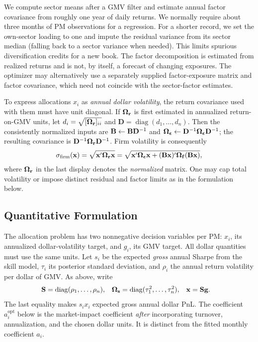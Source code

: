 \documentclass[11pt]{gappyarticle}
\begin{document}
We compute sector means after a GMV filter and estimate annual factor
covariance from roughly one year of daily returns. We normally require
about three months of PM observations for a regression. For a shorter
record, we set the own-sector loading to one and impute the residual
variance from its sector median (falling back to a sector variance when
needed). This limits spurious diversification credits for a new book. The
factor decomposition is estimated from realized returns and is not, by
itself, a forecast of changing exposures. The optimizer may alternatively
use a separately supplied factor-exposure matrix and factor covariance,
which need not coincide with the sector-factor estimates.

To express allocations $x_i$ as \emph{annual dollar volatility}, the return
covariance used with them must have unit diagonal. If ${\boldsymbol{\Omega}}_{\mathbf{r}}$ is first
estimated in annualized return-on-GMV units, let
$d_i=\sqrt{[{\boldsymbol{\Omega}}_{\mathbf{r}}]_{ii}}$ and
$\mathbf D=\operatorname{diag}(d_1,\ldots,d_n)$. Then the consistently normalized
inputs are ${\mathbf{B}}\leftarrow{\mathbf{B}}\mathbf D^{-1}$ and
${\boldsymbol{\Omega}}_{\boldsymbol{\epsilon}}\leftarrow\mathbf D^{-1}{\boldsymbol{\Omega}}_{\boldsymbol{\epsilon}}\mathbf D^{-1}$;
the resulting covariance is
$\mathbf D^{-1}{\boldsymbol{\Omega}}_{\mathbf{r}}\mathbf D^{-1}$. Firm volatility is consequently
\begin{align}
    \sigma_{\mathrm{firm}}({\mathbf{x}})
       =\sqrt{{\mathbf{x}}'{\boldsymbol{\Omega}}_{\mathbf{r}}{\mathbf{x}}}
       =\sqrt{{\mathbf{x}}'{\boldsymbol{\Omega}}_{\boldsymbol{\epsilon}}{\mathbf{x}}
             +({\mathbf{B}}{\mathbf{x}})'{\boldsymbol{\Omega}}_{\mathbf{f}}({\mathbf{B}}{\mathbf{x}})},
\end{align}
where ${\boldsymbol{\Omega}}_{\mathbf{r}}$ in the last display denotes the \emph{normalized}
matrix. One may cap total volatility or impose distinct residual and factor
limits as in the formulation below.

\subsection{Quantitative Formulation}
The allocation problem has two nonnegative decision variables per PM:
$x_i$, its annualized dollar-volatility target, and $g_i$, its GMV target.
All dollar quantities must use the same units. Let $s_i$ be the expected
\emph{gross} annual Sharpe from the skill
model, $\tau_i$ its posterior standard deviation, and $\rho_i$ the annual
return volatility per dollar of GMV. As above, write
\begin{align}
    {\mathbf{S}}&=\operatorname{diag}(\rho_1,\ldots,\rho_n),&
    {\boldsymbol{\Omega}}_{\mathbf{s}}&=\operatorname{diag}(\tau_1^2,\ldots,\tau_n^2),&
    {\mathbf{x}}&={\mathbf{S}}\mathbf g.
\end{align}
The last equality makes $s_i x_i$ expected gross annual dollar PnL.
The coefficient $a_i^{\mathrm{opt}}$ below is the market-impact coefficient
\emph{after} incorporating turnover, annualization, and the chosen
dollar units. It is distinct from the fitted monthly coefficient $a_i$.
\end{document}
